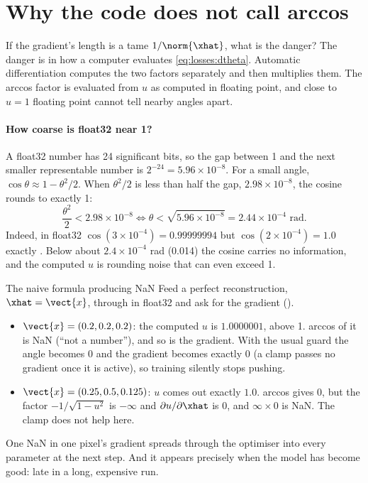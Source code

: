 \section{Why the code does not call arccos}\label{sec:losses:atan2}

If the gradient's length is a tame $1/\norm{\xhat}$, what is the danger? The danger is in how a
computer evaluates \cref{eq:losses:dtheta}. Automatic differentiation computes the two factors
separately and then multiplies them. The arccos factor is evaluated from $u$ as computed in
floating point, and close to $u = 1$ floating point cannot tell nearby angles apart.

\paragraph{How coarse is float32 near 1?} A float32 number has 24 significant bits, so the gap
between 1 and the next smaller representable number is $2^{-24} = 5.96 \times 10^{-8}$. For a
small angle, $\cos\theta \approx 1 - \theta^2/2$. When $\theta^2/2$ is less than half the gap,
$2.98 \times 10^{-8}$, the cosine rounds to exactly 1:
\[
\frac{\theta^2}{2} < 2.98\times 10^{-8} \iff \theta < \sqrt{5.96\times 10^{-8}} = 2.44 \times 10^{-4}\text{ rad}.
\]
Indeed, in float32 $\cos(3\times 10^{-4}) = 0.99999994$ but $\cos(2 \times 10^{-4}) = 1.0$
exactly \tagC. Below about $2.4 \times 10^{-4}$ rad (0.014\textdegree) the cosine carries no
information, and the computed $u$ is rounding noise that can even exceed 1.

\begin{worked}[label={we:losses:nan}]{The naive formula producing NaN}
Feed a perfect reconstruction, $\xhat = \vect{x}$, through
 in float32 and ask for the gradient
().
\begin{itemize}
\item $\vect{x} = (0.2, 0.2, 0.2)$: the computed $u$ is $1.0000001$, above 1. arccos of it is
NaN (``not a number''), and so is the gradient. With the usual guard  the
angle becomes 0 and the gradient becomes exactly 0 (a clamp passes no gradient once it is
active), so training silently stops pushing.
\item $\vect{x} = (0.25, 0.5, 0.125)$: $u$ comes out exactly $1.0$. arccos gives 0, but the
factor $-1/\sqrt{1 - u^2}$ is $-\infty$ and $\partial u/\partial\xhat$ is 0, and $\infty \times 0$
is NaN. The clamp does not help here.
\end{itemize}
One NaN in one pixel's gradient spreads through the optimiser into every parameter at the
next step. And it appears precisely when the model has become good: late in a long, expensive
run.
\end{worked}

